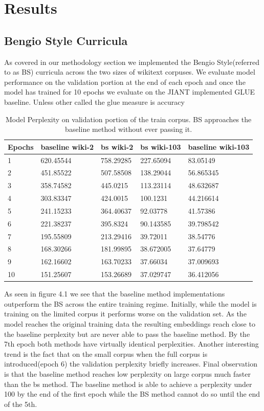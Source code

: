 \chapter{Results}
\section{Bengio Style Curricula}
As covered in our methodology section we implemented the Bengio Style(referred to as BS) curricula across the two sizes of wikitext corpuses. We evaluate model performance on the validation portion at the end of each epoch and once the model has trained for 10 epochs we evaluate on the JIANT implemented GLUE baseline. Unless other called the glue measure is accuracy
\begin{table}[!h]
\begin{tabular}{|l|l|l|l|l|}
\hline 
Epochs & baseline wiki-2 & bs wiki-2 & bs wiki-103 & baseline wiki-103 \\ \hline \hline  
1  & 620.45544 & 758.29285 & 227.65094 & 83.05149  \\ \hline 
2  & 451.85522 & 507.58508 & 138.29044 & 56.865345 \\ \hline 
3  & 358.74582 & 445.0215  & 113.23114 & 48.632687 \\ \hline  
4  & 303.83347 & 424.0015  & 100.1231  & 44.216614 \\ \hline  
5  & 241.15233 & 364.40637 & 92.03778  & 41.57386  \\ \hline  
6  & 221.38237 & 395.8324  & 90.143585 & 39.798542 \\ \hline 
7  & 195.55809 & 213.29416 & 39.72011  & 38.54776  \\ \hline  
8  & 168.30266 & 181.99895 & 38.672005 & 37.64779  \\ \hline 
9  & 162.16602 & 163.70233 & 37.66034  & 37.009693 \\ \hline 
10 & 151.25607 & 153.26689 & 37.029747 & 36.412056 \\ \hline 
\end{tabular}
\label{table:corpuscurriculaperplexity}
\caption{Model Perplexity on validation portion of the train corpus. BS approaches the baseline method without ever passing it.}
\end{table}
As seen in figure 4.1 we see that the baseline method implementations outperform the BS across the entire training regime. Initially, while the model is training on the limited corpus it performs worse on the validation set. As the model reaches the original training data the resulting embeddings reach close to the baseline perplexity but are never able to pass the baseline method. By the 7th epoch both methods have virtually identical perplexities. Another interesting trend is the fact that on the small corpus when the full corpus is introduced(epoch 6) the validation perplexity briefly increases. Final observation is that the baseline method reaches low perplexity on large corpus much faster than the bs method. The baseline method is able to achieve a perplexity under 100 by the end of the first epoch while the BS method cannot do so until the end of the 5th. \\

